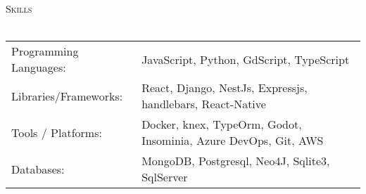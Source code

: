 \documentclass[a4paper]{article}
\newcommand{\lineunder} {
    \vspace*{-8pt} \\
    \hspace*{-18pt} \hrulefill \\
}
\newcommand{\header} [1] {
    {\hspace*{-18pt}\vspace*{6pt} \textsc{#1}}
    \vspace*{-6pt} \lineunder
}
\begin{document}
%
%
\header{Skills}
\vspace{2mm}
\begin{longtable}{p{4cm}p{12cm}}
    Programming Languages: & JavaScript, Python, GdScript, TypeScript                        \\
    Libraries/Frameworks:  & React, Django, NestJs, Expressjs, handlebars, React-Native      \\
    Tools / Platforms:     & Docker, knex, TypeOrm, Godot, Insominia, Azure DevOps, Git, AWS \\
    Databases:             & MongoDB, Postgresql, Neo4J, Sqlite3, SqlServer                  \\
\end{longtable}
\vspace{1mm}
\end{document}
